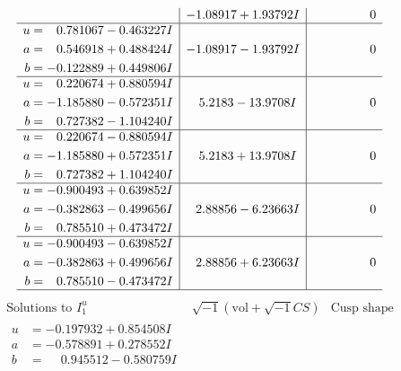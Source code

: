 \documentclass[1p]{elsarticle_modified}
\theoremstyle{definition}
\newcommand{\I}{\sqrt{-1}}
\begin{document}
$$\begin{array}{c|c|c}
 & -1.08917 + 1.93792 I & \phantom{-0.000000 } 0 \\ \hline\begin{aligned}
u &= \phantom{-}0.781067 - 0.463227 I \\
a &= \phantom{-}0.546918 + 0.488424 I \\
b &= -0.122889 + 0.449806 I\end{aligned}
 & -1.08917 - 1.93792 I & \phantom{-0.000000 } 0 \\ \hline\begin{aligned}
u &= \phantom{-}0.220674 + 0.880594 I \\
a &= -1.185880 - 0.572351 I \\
b &= \phantom{-}0.727382 - 1.104240 I\end{aligned}
 & \phantom{-}5.2183 - 13.9708 I & \phantom{-0.000000 } 0 \\ \hline\begin{aligned}
u &= \phantom{-}0.220674 - 0.880594 I \\
a &= -1.185880 + 0.572351 I \\
b &= \phantom{-}0.727382 + 1.104240 I\end{aligned}
 & \phantom{-}5.2183 + 13.9708 I & \phantom{-0.000000 } 0 \\ \hline\begin{aligned}
u &= -0.900493 + 0.639852 I \\
a &= -0.382863 - 0.499656 I \\
b &= \phantom{-}0.785510 + 0.473472 I\end{aligned}
 & \phantom{-}2.88856 - 6.23663 I & \phantom{-0.000000 } 0 \\ \hline\begin{aligned}
u &= -0.900493 - 0.639852 I \\
a &= -0.382863 + 0.499656 I \\
b &= \phantom{-}0.785510 - 0.473472 I\end{aligned}
 & \phantom{-}2.88856 + 6.23663 I & \phantom{-0.000000 } 0\\
 \hline 
 \end{array}$$\newpage$$\begin{array}{c|c|c}  
\text{Solutions to }I^u_{1}& \I (\text{vol} + \sqrt{-1}CS) & \text{Cusp shape}\\
 \hline 
\begin{aligned}
u &= -0.197932 + 0.854508 I \\
a &= -0.578891 + 0.278552 I \\
b &= \phantom{-}0.945512 - 0.580759 I\end{aligned}

\end{array}$$
\end{document}
